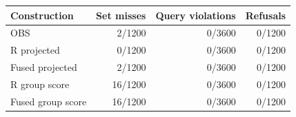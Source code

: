 \begin{tabular}{lrrr}
\toprule
Construction & Set misses & Query violations & Refusals\\
\midrule
OBS & 2/1200 & 0/3600 & 0/1200\\
R projected & 0/1200 & 0/3600 & 0/1200\\
Fused projected & 2/1200 & 0/3600 & 0/1200\\
R group score & 16/1200 & 0/3600 & 0/1200\\
Fused group score & 16/1200 & 0/3600 & 0/1200\\
\bottomrule
\end{tabular}

